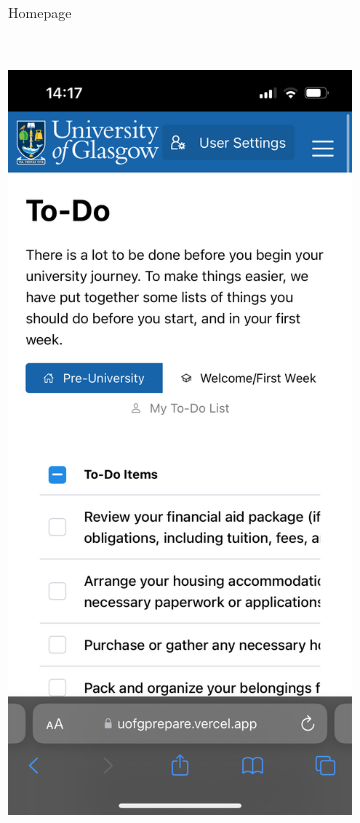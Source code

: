 \documentclass{l4proj}
\begin{document}
\begin{figure}[ht]
\begin{subfigure}[b]{0.3\textwidth}
        \caption{Homepage}
        \label{fig:mobileHome}
    \end{subfigure}
    ~ %
    \begin{subfigure}[b]{0.3\textwidth}
        \includegraphics[width=\textwidth]{images/mobileToDo.pdf}

\end{subfigure}
\end{figure}
\end{document}
